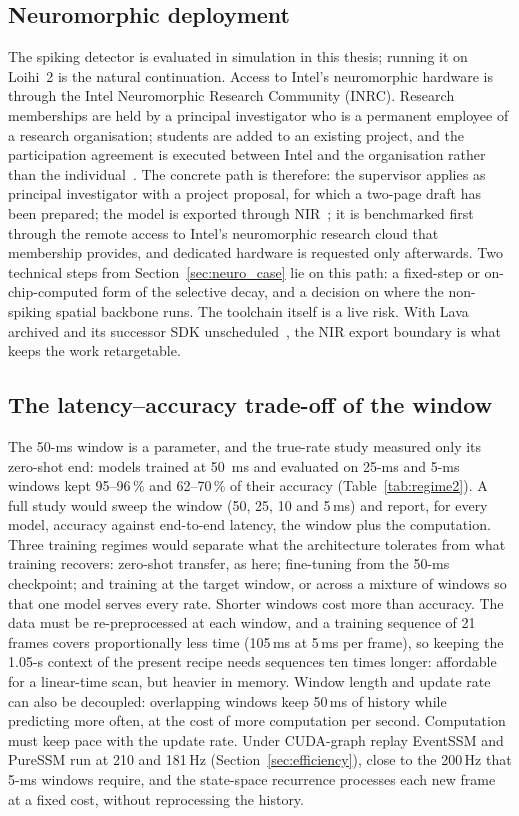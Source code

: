 \documentclass[11pt, a4paper]{report}
\begin{document}
\subsection{Neuromorphic deployment}
The spiking detector is evaluated in simulation in this thesis; running it on Loihi~2 is the natural
continuation. Access to Intel's neuromorphic hardware is through the Intel Neuromorphic Research
Community (INRC). Research memberships are held by a principal investigator who is a permanent employee of
a research organisation; students are added to an existing project, and the participation agreement is
executed between Intel and the organisation rather than the individual~\cite{intel2026inrc}. The concrete
path is therefore: the supervisor applies as principal investigator with a project proposal, for which a
two-page draft has been prepared; the model is exported through NIR~\cite{pedersen2024neuromorphic}; it is
benchmarked first through the remote access to Intel's neuromorphic research cloud that membership
provides, and dedicated hardware is requested only afterwards. Two technical steps from
Section~\ref{sec:neuro_case} lie on this path: a fixed-step or on-chip-computed form of the selective
decay, and a decision on where the non-spiking spatial backbone runs. The toolchain itself is a live
risk. With Lava archived and its successor SDK unscheduled~\cite{intel2026lava}, the NIR export boundary
is what keeps the work retargetable.

\subsection{The latency--accuracy trade-off of the window}
\label{subsec:fw_window}
The 50-ms window is a parameter, and the true-rate study measured only its zero-shot end: models trained
at 50~ms and evaluated on 25-ms and 5-ms windows kept 95--96\,\% and 62--70\,\% of their accuracy
(Table~\ref{tab:regime2}). A full study would sweep the window (50, 25, 10 and 5\,ms) and report, for every
model, accuracy against end-to-end latency, the window plus the computation. Three training regimes would
separate what the architecture tolerates from what training recovers: zero-shot transfer, as here;
fine-tuning from the 50-ms checkpoint; and training at the target window, or across a mixture of windows so
that one model serves every rate. Shorter windows cost more than accuracy. The data must be re-preprocessed
at each window, and a training sequence of 21 frames covers proportionally less time (105\,ms at 5\,ms per
frame), so keeping the 1.05-s context of the present recipe needs sequences ten times longer: affordable for
a linear-time scan, but heavier in memory. Window length and update rate can also be decoupled: overlapping
windows keep 50\,ms of history while predicting more often, at the cost of more computation per second.
Computation must keep pace with the update rate. Under CUDA-graph replay EventSSM and PureSSM run at 210 and
181\,Hz (Section~\ref{sec:efficiency}), close to the 200\,Hz that 5-ms windows require, and the
state-space recurrence processes each new frame at a fixed cost, without reprocessing the history.
\end{document}
